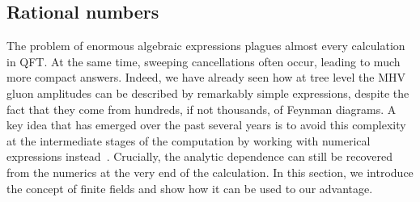 \documentclass[main.tex]{subfiles}
\begin{document}
\subsection{Rational numbers} \label{sec:ratnums}
The problem of enormous algebraic expressions plagues almost every calculation in QFT. At the same time, sweeping cancellations often occur, leading to much more compact answers. Indeed, we have already seen how at tree level the MHV gluon amplitudes can be described by remarkably simple expressions, despite the fact that they come from hundreds, if not thousands, of Feynman diagrams. A key idea that has emerged over the past several years is to avoid this complexity at the intermediate stages of the computation by working with numerical expressions instead~\cite{Peraro:2016wsq, Peraro:2019svx, Klappert:2019emp, Klappert:2020aqs, vonManteuffel:2014ixa, Abreu:2020xvt}. Crucially, the analytic dependence can still be recovered from the numerics at the very end of the calculation. In this section, we introduce the concept of finite fields and show how it can be used to our advantage.
\end{document}
